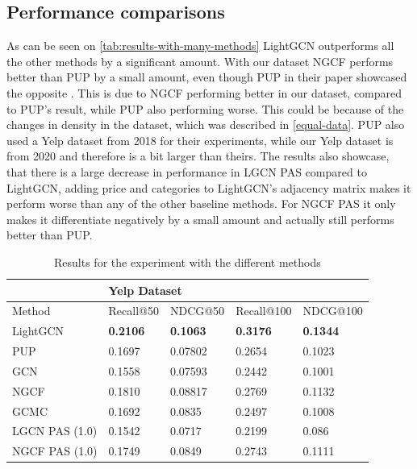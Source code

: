 \subsection{Performance comparisons}\label{subsec:performance-com}
As can be seen on \autoref{tab:results-with-many-methods} LightGCN outperforms all the other methods by a significant amount.
With our dataset NGCF performs better than PUP by a small amount, even though  PUP in their paper showcased the opposite \cite{Priceaware}.
This is due to NGCF performing better in our dataset, compared to PUP's result, while PUP also performing worse.
This could be because of the changes in density in the dataset, which was described in \autoref{equal-data}.
PUP also used a Yelp dataset from 2018 for their experiments, while our Yelp dataset is from 2020 and therefore is a bit larger than theirs.
The results also showcase, that there is a large decrease in performance in LGCN PAS compared to LightGCN, adding price and categories to LightGCN's adjacency matrix makes it perform worse than any of the other baseline methods.
For NGCF PAS it only makes it differentiate negatively by a small amount and actually still performs better than PUP.
\begin{table}[h!]
    \centering
    \begin{tabular}{|l|l|l|l|l|}
        \hline
        \rowcolor[HTML]{FFFFFF}
                       & \multicolumn{4}{l|}{\cellcolor[HTML]{FFFFFF}Yelp Dataset}                                                       \\ \hline
        Method         & Recall@50                                                 & NDCG@50         & Recall@100      & NDCG@100        \\ \hline
        LightGCN       & \textbf{0.2106}                                           & \textbf{0.1063} & \textbf{0.3176} & \textbf{0.1344} \\ \hline
        PUP            & 0.1697                                                    & 0.07802         & 0.2654          & 0.1023          \\ \hline
        GCN            & 0.1558                                                    & 0.07593         & 0.2442          & 0.1001          \\ \hline
        NGCF           & 0.1810                                                    & 0.08817         & 0.2769          & 0.1132          \\ \hline
        GCMC           & 0.1692                                                    & 0.0835          & 0.2497          & 0.1008          \\ \hline
        LGCN PAS (1.0) & 0.1542                                                    & 0.0717          & 0.2199          & 0.086           \\ \hline
        NGCF PAS (1.0) & 0.1749                                                    & 0.0849          & 0.2743          & 0.1111          \\ \hline
    \end{tabular}
    \caption{Results for the experiment with the different methods}
    \label{tab:results-with-many-methods}
\end{table}
